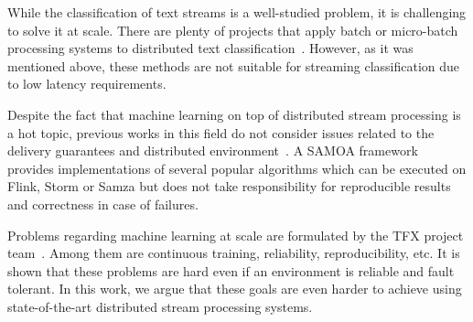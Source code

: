 \label{fs-related}

While the classification of text streams is a well-studied problem, it is challenging to solve it at scale. There are plenty of projects that apply batch or micro-batch processing systems to distributed text classification~\cite{semberecki2016distributed, 8029336, baltas2016apache, svyatkovskiy2016large, Nodarakis2016LargeSS}. However, as it was mentioned above, these methods are not suitable for streaming classification due to low latency requirements. 

Despite the fact that machine learning on top of distributed stream processing is a hot topic, previous works in this field do not consider issues related to the delivery guarantees and distributed environment~\cite{khumoyun2016real}. A SAMOA framework~\cite{morales2015samoa} provides implementations of several popular algorithms which can be executed on Flink, Storm or Samza but does not take responsibility for reproducible results and correctness in case of failures.

Problems regarding machine learning at scale are formulated by the TFX project team~\cite{Baylor:2017:TTP:3097983.3098021}. Among them are continuous training, reliability, reproducibility, etc. It is shown that these problems are hard even if an environment is reliable and fault tolerant. In this work, we argue that these goals are even harder to achieve using state-of-the-art distributed stream processing systems.